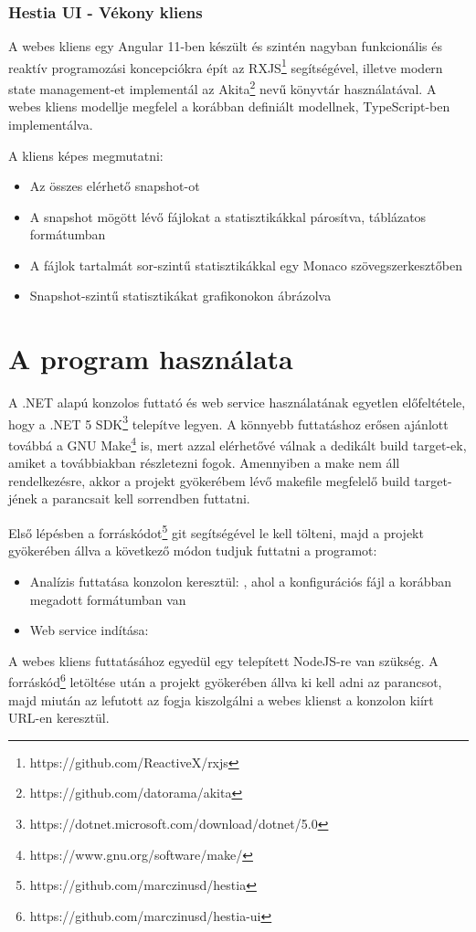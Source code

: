 \subsubsection{Hestia UI - Vékony kliens}

A webes kliens egy Angular 11-ben készült és szintén nagyban funkcionális és reaktív programozási koncepciókra épít az RXJS\footnote{https://github.com/ReactiveX/rxjs} segítségével, illetve modern state management-et implementál az Akita\footnote{https://github.com/datorama/akita} nevű könyvtár használatával. A webes kliens modellje megfelel a korábban definiált modellnek, TypeScript-ben implementálva.

A kliens képes megmutatni:
\begin{itemize}
    \item Az összes elérhető snapshot-ot
    \item A snapshot mögött lévő fájlokat a statisztikákkal párosítva, táblázatos formátumban
    \item A fájlok tartalmát sor-szintű statisztikákkal egy Monaco szövegszerkesztőben
    \item Snapshot-szintű statisztikákat grafikonokon ábrázolva
\end{itemize}

\section{A program használata}

A .NET alapú konzolos futtató és web service használatának egyetlen előfeltétele, hogy a .NET 5 SDK\footnote{https://dotnet.microsoft.com/download/dotnet/5.0} telepítve legyen. A könnyebb futtatáshoz erősen ajánlott továbbá a GNU Make\footnote{https://www.gnu.org/software/make/} is, mert azzal elérhetővé válnak a dedikált build target-ek, amiket a továbbiakban részletezni fogok. Amennyiben a make nem áll rendelkezésre, akkor a projekt gyökerébem lévő makefile megfelelő build target-jének a parancsait kell sorrendben futtatni.

Első lépésben a forráskódot\footnote{https://github.com/marczinusd/hestia} git segítségével le kell tölteni, majd a projekt gyökerében állva a következő módon tudjuk futtatni a programot:

\begin{itemize}
    \item Analízis futtatása konzolon keresztül: , ahol a konfigurációs fájl a korábban megadott formátumban van
    \item Web service indítása: 
\end{itemize}

A webes kliens futtatásához egyedül egy telepített NodeJS-re van szükség. A forráskód\footnote{https://github.com/marczinusd/hestia-ui} letöltése után a projekt gyökerében állva ki kell adni az  parancsot, majd miután az lefutott az  fogja kiszolgálni a webes klienst a konzolon kiírt URL-en keresztül.
